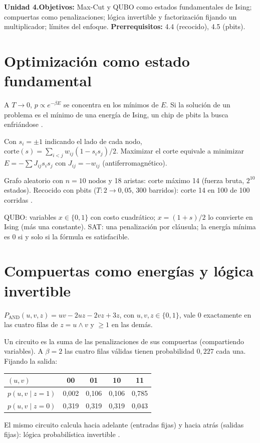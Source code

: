 \documentclass[11pt,a4paper]{article}
\begin{document}

\noindent\textbf{Unidad 4.}\quad\textbf{Objetivos:} Max-Cut y QUBO como estados fundamentales de Ising; compuertas como penalizaciones; lógica invertible y
factorización fijando un multiplicador; límites del enfoque.
\textbf{Prerrequisitos:} 4.4 (recocido), 4.5 (pbits).

\section{Optimización como estado fundamental}
A $T\to0$, $p\propto e^{-\beta E}$ se concentra en los mínimos de $E$. Si la solución de un problema es el mínimo de una energía de Ising, un chip de
pbits la busca enfriándose \cite{lucas}.
\begin{resultado}
Con $s_i=\pm1$ indicando el lado de cada nodo, $\text{corte}(s)=\sum_{i<j}w_{ij}(1-s_is_j)/2$. Maximizar el corte equivale a minimizar $E=-\sum J_{ij}s_is_j$
con $J_{ij}=-w_{ij}$ (antiferromagnético).
\end{resultado}
\begin{ejemplo}
Grafo aleatorio con $n=10$ nodos y 18 aristas: corte máximo 14 (fuerza bruta, $2^{10}$ estados). Recocido con pbits ($T:2\to0{,}05$, 300 barridos):
corte 14 en 100 de 100 corridas \evS.
\end{ejemplo}
QUBO: variables $x\in\{0,1\}$ con costo cuadrático; $x=(1+s)/2$ lo convierte en Ising (más una constante). SAT: una penalización por cláusula; la energía mínima
es 0 si y solo si la fórmula es satisfacible.

\section{Compuertas como energías y lógica invertible}
\begin{definicion}
$P_{\text{AND}}(u,v,z)=uv-2uz-2vz+3z$, con $u,v,z\in\{0,1\}$, vale 0 exactamente en las cuatro filas de $z=u\wedge v$ y $\ge1$ en las demás.
\end{definicion}
Un circuito es la suma de las penalizaciones de sus compuertas (compartiendo variables). A $\beta=2$ las cuatro filas válidas tienen probabilidad $0{,}227$
cada una. Fijando la salida:
\begin{center}\begin{tabular}{lcccc}\toprule
$(u,v)$ & 00 & 01 & 10 & 11\\\midrule
$p(u,v\mid z=1)$ & 0,002 & 0,106 & 0,106 & 0,785\\
$p(u,v\mid z=0)$ & 0,319 & 0,319 & 0,319 & 0,043\\\bottomrule\end{tabular}\end{center}
El mismo circuito calcula hacia adelante (entradas fijas) y hacia atrás (salidas fijas): lógica probabilística invertible \cite{camsari}.
\end{document}
